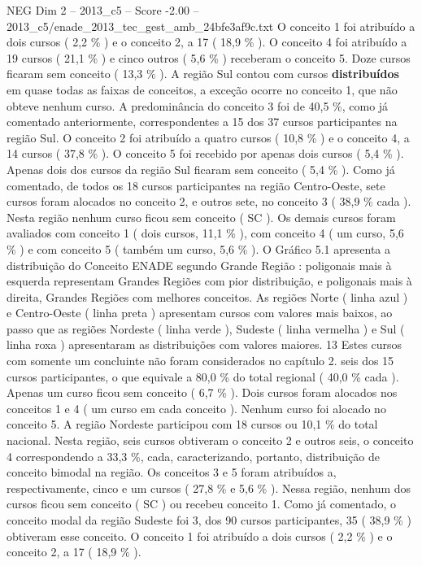 \begin{textsample}{NEG Dim 2 – 2013\_c5 – Score -2.00 – 2013\_c5/enade\_2013\_tec\_gest\_amb\_24bfe3af9c.txt}
O conceito 1 foi atribuído a dois cursos ( 2,2 \% ) e o conceito 2, a 17 ( 18,9 \% ).
O conceito 4 foi atribuído a 19 cursos ( 21,1 \% ) e cinco outros ( 5,6 \% ) receberam o conceito 5.
Doze cursos ficaram sem conceito ( 13,3 \% ).
A região Sul contou com cursos \textbf{distribuídos} em quase todas as faixas de conceitos, a exceção ocorre no conceito 1, que não obteve nenhum curso.
A predominância do conceito 3 foi de 40,5 \%, como já comentado anteriormente, correspondentes a 15 dos 37 cursos participantes na região Sul.
O conceito 2 foi atribuído a quatro cursos ( 10,8 \% ) e o conceito 4, a 14 cursos ( 37,8 \% ).
O conceito 5 foi recebido por apenas dois cursos ( 5,4 \% ).
Apenas dois dos cursos da região Sul ficaram sem conceito ( 5,4 \% ).
Como já comentado, de todos os 18 cursos participantes na região Centro-Oeste, sete cursos foram alocados no conceito 2, e outros sete, no conceito 3 ( 38,9 \% cada ).
Nesta região nenhum curso ficou sem conceito ( SC ).
Os demais cursos foram avaliados com conceito 1 ( dois cursos, 11,1 \% ), com conceito 4 ( um curso, 5,6 \% ) e com conceito 5 ( também um curso, 5,6 \% ).
O Gráfico 5.1 apresenta a distribuição do Conceito ENADE segundo Grande Região : poligonais mais à esquerda representam Grandes Regiões com pior distribuição, e poligonais mais à direita, Grandes Regiões com melhores conceitos.
As regiões Norte ( linha azul ) e Centro-Oeste ( linha preta ) apresentam cursos com valores mais baixos, ao passo que as regiões Nordeste ( linha verde ), Sudeste ( linha vermelha ) e Sul ( linha roxa ) apresentaram as distribuições com valores maiores. 13 Estes cursos com somente um concluinte não foram considerados no capítulo 2. seis dos 15 cursos participantes, o que equivale a 80,0 \% do total regional ( 40,0 \% cada ).
Apenas um curso ficou sem conceito ( 6,7 \% ).
Dois cursos foram alocados nos conceitos 1 e 4 ( um curso em cada conceito ).
Nenhum curso foi alocado no conceito 5.
A região Nordeste participou com 18 cursos ou 10,1 \% do total nacional.
Nesta região, seis cursos obtiveram o conceito 2 e outros seis, o conceito 4 correspondendo a 33,3 \%, cada, caracterizando, portanto, distribuição de conceito bimodal na região.
Os conceitos 3 e 5 foram atribuídos a, respectivamente, cinco e um cursos ( 27,8 \% e 5,6 \% ).
Nessa região, nenhum dos cursos ficou sem conceito ( SC ) ou recebeu conceito 1.
Como já comentado, o conceito modal da região Sudeste foi 3, dos 90 cursos participantes, 35 ( 38,9 \% ) obtiveram esse conceito.
O conceito 1 foi atribuído a dois cursos ( 2,2 \% ) e o conceito 2, a 17 ( 18,9 \% ).

\end{textsample}
